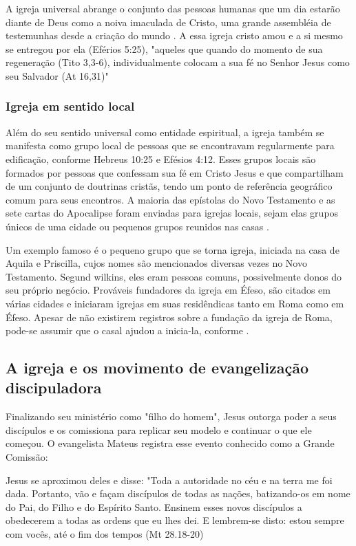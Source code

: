 \documentclass[
	12pt,				%
	openright,			%
	twoside,			%
	a4paper,			%
	english,			%
	french,				%
	spanish,			%
	brazil				%
	]{abntex2}
\begin{document}
A igreja universal abrange o conjunto das pessoas humanas que um dia estarão diante de Deus como a noiva imaculada de Cristo, uma grande assembléia de testemunhas desde a criação do mundo \cite[607]{bavinck}. A essa igreja cristo amou e a si mesmo se entregou por ela (Eférios 5:25), "aqueles que quando do momento de sua regeneração (Tito 3,3-6), individualmente colocam a sua fé no Senhor Jesus como seu Salvador (At 16,31)" \cite[319]{zac}

\subsubsection{Igreja em sentido local}


Além do seu sentido universal como entidade espiritual, a igreja também se manifesta como grupo local de pessoas que se encontravam regularmente para edificação, conforme Hebreus 10:25 e Efésios 4:12. Esses grupos locais são formados por pessoas que confessam sua fé em Cristo Jesus e que compartilham de um conjunto de doutrinas cristãs, tendo um ponto de referência geográfico comum para seus encontros. A maioria das epístolas do Novo Testamento e as sete cartas do Apocalipse foram enviadas para igrejas locais, sejam elas grupos únicos de uma cidade ou pequenos grupos reunidos nas casas \cite[320]{zac}. 

Um exemplo famoso é o pequeno grupo que se torna igreja, iniciada na casa de Aquila e Priscilla, cujos nomes são mencionados diversas vezes no Novo Testamento. Segund wilkins, eles eram pessoas comuns, possivelmente donos do seu próprio negócio. Prováveis fundadores da igreja em Éfeso, são citados em várias cidades e iniciaram igrejas em suas residêndicas tanto em Roma como em Éfeso. Apesar de não existirem registros sobre a fundação da igreja de Roma, pode-se assumir que o casal ajudou a inicia-la, conforme \cite[54]{stetzer}.

\subsection{A igreja e os movimento de evangelização discipuladora}

Finalizando seu ministério como "filho do homem", Jesus outorga poder a seus discípulos e os comissiona para replicar seu modelo e continuar o que ele começou. O evangelista Mateus registra esse evento conhecido como a Grande Comissão: 

\begin{citacao}
Jesus se aproximou deles e disse: "Toda a autoridade no céu e na terra me foi dada. Portanto, vão e façam discípulos de todas as nações, batizando-os em nome do Pai, do Filho e do Espírito Santo. Ensinem esses novos discípulos a obedecerem a todas as ordens que eu lhes dei. E lembrem-se disto: estou sempre com vocês, até o fim dos tempos (Mt 28.18-20)
\end{citacao}
\end{document}
